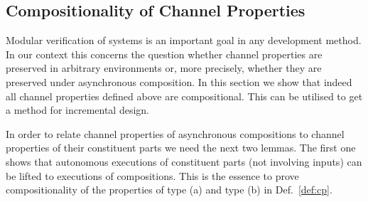 \subsection{Compositionality of Channel Properties}\label{subsec:comp-prop}

Modular verification of systems is an important goal in any development method.
In our context this concerns the question whether channel properties are preserved in arbitrary environments
or, more precisely, whether they are preserved under asynchronous composition.
In this section we show that indeed all channel properties defined above are compositional.
This can be utilised to get a method for incremental design.



In order to relate channel properties of asynchronous compositions to channel properties
of their constituent parts we need the next two lemmas.
The first one shows that autonomous executions of constituent parts (not involving inputs)
can be lifted to executions of compositions.
This is the essence to prove compositionality of the
properties of type (a) and type (b) in Def.~\ref{def:cp}.


